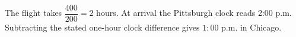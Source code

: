 The flight takes $\dfrac{400}{200}=2$ hours. At arrival the Pittsburgh clock reads 2:00 p.m. Subtracting the stated one-hour clock difference gives $\boxed{1{:}00\text{ p.m.}}$ in Chicago.
